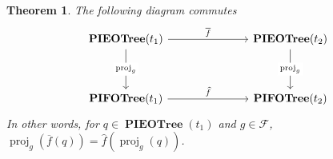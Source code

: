 \documentclass{amsart}
\makeatletter
\DeclareMathOperator{\proj}{\mathrm{proj}}
\DeclareMathOperator{\PIEOTree}{\mathbf{PIEOTree}}
\DeclareMathOperator{\PIFOTree}{\mathbf{PIFOTree}}
\newtheorem{thm}{Theorem}[section]
\theoremstyle{definition}
\newcommand{\reqnomode}{\tagsleft@false\let\veqno\@@eqno}
\makeatother
\begin{document}
\reqnomode

\begin{thm}
    \label{thm:cd}
    The following diagram commutes
    $$
    \begin{tikzcd}
    	{\PIEOTree(t_1)} &&& {\PIEOTree(t_2)} \\
    	\\
    	{\PIFOTree(t_1)} &&& {\PIFOTree(t_2)}
    	\arrow["{\overline{f}}", from=1-1, to=1-4]
    	\arrow["{\proj_g}"{description}, from=1-1, to=3-1]
    	\arrow["{\proj_g}"{description}, from=1-4, to=3-4]
    	\arrow["{\widehat{f}}", from=3-1, to=3-4]
    \end{tikzcd}
    $$
    In other words, for $q \in \PIEOTree(t_1)$ and $g \in \mathcal F$, $\proj_g(\overline{f}(q)) = \widehat{f}(\proj_g(q))$.
\end{thm}
\end{document}
